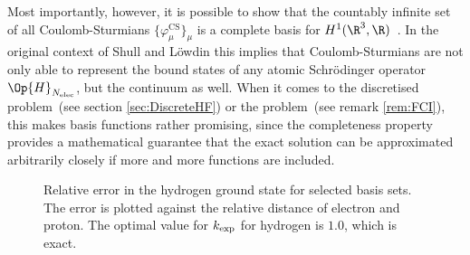 Most importantly, however, it is possible to show
that the countably infinite set of all Coulomb-Sturmians $\{\varphi^\text{CS}_\mu\}_{\mu}$
is a complete basis for $H^1(\R^3, \R)$~\cite[Theorem 2.3.4]{Avery2008}.
In the original context of Shull and Löwdin this implies that Coulomb-Sturmians
are not only able to represent the bound states
of any atomic Schrödinger operator $\Op{H}_{\Nelec}$,
but the continuum as well.
When it comes to the discretised \HF problem~(see section \ref{sec:DiscreteHF})
or the \FCI problem~(see remark \ref{rem:FCI}),
this makes \CS basis functions rather promising,
since the completeness property
provides a mathematical guarantee that the exact solution can be approximated
arbitrarily closely
if more and more \CS functions are included.

\begin{figure}[t]
	\centering
	\caption[
		Relative error in the hydrogen ground state
		for selected \CS basis sets.
	]
	{Relative error in the hydrogen ground state
		for selected \CS basis sets.
		The error is plotted against
		the relative distance of electron and proton.
		The optimal value for $k_\text{exp}$ for hydrogen is $1.0$,
		which is exact.
	}
	\label{fig:RelativeErrorCS}
\end{figure}

